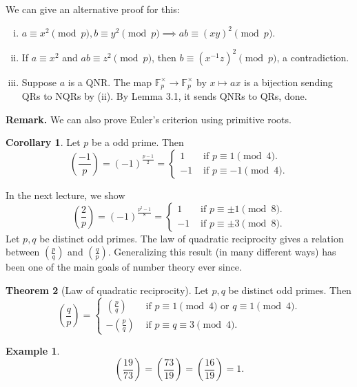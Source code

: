 \documentclass{article}
\theoremstyle{definition}
\newtheorem{theorem}{Theorem}[section]
\newtheorem{cor}[theorem]{Corollary}
\newtheorem{example}{Example}[section]
\begin{document}
We can give an alternative proof for this:
\begin{enumerate}[(i)]
    \item $a \equiv x^2\pmod{p}, b \equiv y^2 \pmod{p} \implies ab \equiv (xy)^2 \pmod{p}$.
    \item If $a \equiv x^2$ and $ab \equiv z^2 \pmod{p}$, then $b \equiv (x^{-1}z)^2 \pmod{p}$, a contradiction.
    \item Suppose $a$ is a QNR. The map $\mathbb{F}_p^\times \to \mathbb{F}_p^\times$ by $x \mapsto ax$ is a bijection sending QRs to NQRs by (ii). By Lemma 3.1, it sends QNRs to QRs, done.
\end{enumerate}
\textbf{Remark.} We can also prove Euler's criterion using primitive roots.

\begin{cor}
    Let $p$ be a odd prime. Then 
    \[
        \left(\frac{-1}{p}\right) = (-1)^{\frac{p-1}{2}} = \begin{cases}
            1 &\text{ if } p \equiv 1\pmod{4}.\\
            -1 &\text{ if } p \equiv -1 \pmod{4}.
        \end{cases}
    \]
\end{cor}
In the next lecture, we show 
\[
\left(\frac{2}{p}\right) = (-1)^{\frac{p^2-1}{8}} = \begin{cases}
    1 &\text{ if } p \equiv \pm 1\pmod{8}.\\
    -1 &\text{ if } p \equiv \pm 3 \pmod{8}.
\end{cases}
\]
Let $p,q$ be distinct odd primes. The law of quadratic reciprocity gives a relation between $\left(\frac{p}{q}\right)$ and $\left(\frac{q}{p}\right)$. Generalizing this result (in many different ways) has been one of the main goals of number theory ever since.

\begin{theorem}[Law of quadratic reciprocity]
    Let $p,q$ be distinct odd primes. Then 
    \[
    \left(\frac{q}{p}\right) = \begin{cases}
        \left(\frac{p}{q}\right) &\text{ if } p\equiv 1\pmod{4} \text{ or }q \equiv 1 \pmod{4}. \\
        -\left(\frac{p}{q}\right) &\text{ if } p \equiv q \equiv 3 \pmod{4}.
    \end{cases}
    \]
\end{theorem}
\begin{example}
    $$\left(\frac{19}{73}\right) = \left(\frac{73}{19}\right) = \left(\frac{16}{19}\right) = 1.$$
\end{example}
\end{document}
